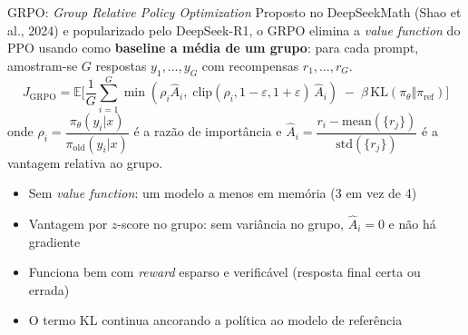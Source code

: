 \documentclass[aspectratio=169, xcolor=dvipsnames]{beamer}
\begin{document}
  \begin{frame}{GRPO: \textit{Group Relative Policy Optimization} \cite{shao2024deepseekmath,deepseekr1}}
        Proposto no DeepSeekMath (Shao et al., 2024) e popularizado pelo DeepSeek-R1, o GRPO elimina a
        \textit{value function} do PPO usando como \textbf{baseline a média de um grupo}: para cada prompt, amostram-se $G$ respostas $y_1,\ldots,y_G$ com recompensas $r_1,\ldots,r_G$.
        \vspace{-0.2em}
          \[
            J_{\text{GRPO}} = \mathbb{E}\!\bigg[\frac{1}{G}\sum_{i=1}^{G}
              \min\!\left(\rho_i\hat{A}_i,\;\text{clip}(\rho_i,1{-}\varepsilon,1{+}\varepsilon)\,\hat{A}_i\right)
              \;-\; \beta\,\text{KL}\!\left(\pi_\theta \Vert \pi_{\text{ref}}\right)
            \bigg]
          \]
          onde $\rho_i = \dfrac{\pi_\theta(y_i|x)}{\pi_{\text{old}}(y_i|x)}$ é a razão de importância e
          $\hat{A}_i = \dfrac{r_i - \text{mean}(\{r_j\})}{\text{std}(\{r_j\})}$ é a vantagem relativa ao grupo.

        \begin{itemize}\small
          \item Sem \textit{value function}: um modelo a menos em memória (3 em vez de 4)
          \item Vantagem por $z$-score no grupo: sem variância no grupo, $\hat{A}_i{=}0$ e não há gradiente
          \item Funciona bem com \textit{reward} esparso e verificável (resposta final certa ou errada)
          \item O termo KL continua ancorando a política ao modelo de referência
        \end{itemize}


\end{frame}
\end{document}
